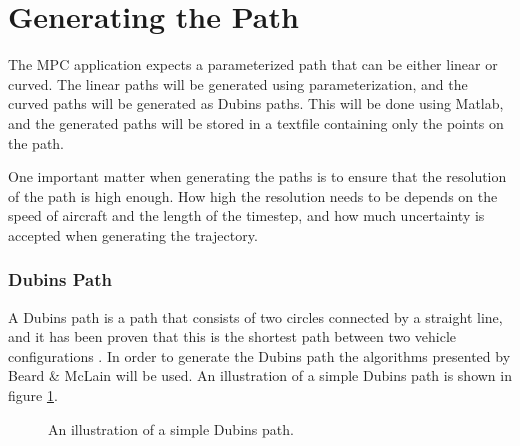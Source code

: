 \section{Generating the Path}

The MPC application expects a parameterized path that can be either linear or curved. The linear paths will be generated using parameterization, and the curved paths will be generated as Dubins paths. This will be done using Matlab, and the generated paths will be stored in a textfile containing only the points on the path.

One important matter when generating the paths is to ensure that the resolution of the path is high enough. How high the resolution needs to be depends on the speed of aircraft and the length of the timestep, and how much uncertainty is accepted when generating the trajectory. 


\subsubsection{Dubins Path}

A Dubins path is a path that consists of two circles connected by a straight line, and it has been proven that this is the shortest path between two vehicle configurations \cite{DUBINS}. In order to generate the Dubins path the algorithms presented by Beard \& McLain \cite{uavBEARD} will be used. An illustration of a simple Dubins path is shown in figure \ref{fig:dubins}.

\begin{figure}[h]
	\centering
	\caption{An illustration of a simple Dubins path.}
	\label{fig:dubins}
\end{figure}